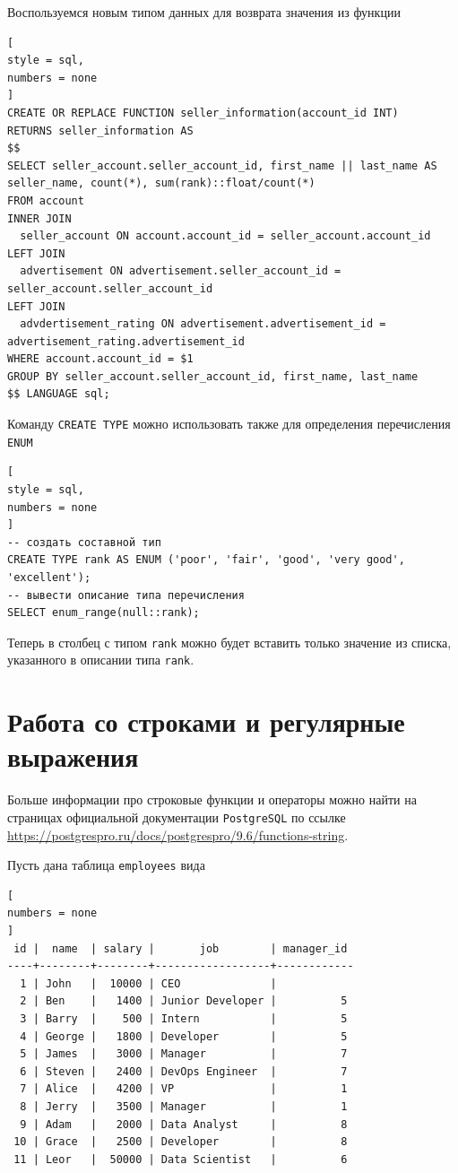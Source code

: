 \documentclass[%
	11pt,
	a4paper,
	utf8,
		]{article}
\begin{document}
Воспользуемся новым типом данных для возврата значения из функции
\begin{lstlisting}[
style = sql,
numbers = none
]
CREATE OR REPLACE FUNCTION seller_information(account_id INT)
RETURNS seller_information AS
$$
SELECT seller_account.seller_account_id, first_name || last_name AS seller_name, count(*), sum(rank)::float/count(*)
FROM account
INNER JOIN
  seller_account ON account.account_id = seller_account.account_id
LEFT JOIN
  advertisement ON advertisement.seller_account_id = seller_account.seller_account_id
LEFT JOIN
  advdertisement_rating ON advertisement.advertisement_id = advertisement_rating.advertisement_id
WHERE account.account_id = $1
GROUP BY seller_account.seller_account_id, first_name, last_name
$$ LANGUAGE sql;
\end{lstlisting}

Команду \texttt{CREATE TYPE} можно использовать также для определения перечисления \texttt{ENUM}
\begin{lstlisting}[
style = sql,
numbers = none
]
-- создать составной тип
CREATE TYPE rank AS ENUM ('poor', 'fair', 'good', 'very good', 'excellent');
-- вывести описание типа перечисления
SELECT enum_range(null::rank);
\end{lstlisting}

Теперь в столбец с типом \texttt{rank} можно будет вставить только значение из списка, указанного в описании типа \texttt{rank}.



\section{Работа со строками и регулярные выражения}

Больше информации про строковые функции и операторы можно найти на страницах официальной документации \texttt{PostgreSQL} по ссылке \url{https://postgrespro.ru/docs/postgrespro/9.6/functions-string}.

Пусть дана таблица \texttt{employees} вида
\begin{lstlisting}[
numbers = none
]
 id |  name  | salary |       job        | manager_id
----+--------+--------+------------------+------------
  1 | John   |  10000 | CEO              |
  2 | Ben    |   1400 | Junior Developer |          5
  3 | Barry  |    500 | Intern           |          5
  4 | George |   1800 | Developer        |          5
  5 | James  |   3000 | Manager          |          7
  6 | Steven |   2400 | DevOps Engineer  |          7
  7 | Alice  |   4200 | VP               |          1
  8 | Jerry  |   3500 | Manager          |          1
  9 | Adam   |   2000 | Data Analyst     |          8
 10 | Grace  |   2500 | Developer        |          8
 11 | Leor   |  50000 | Data Scientist   |          6
\end{lstlisting}
\end{document}
